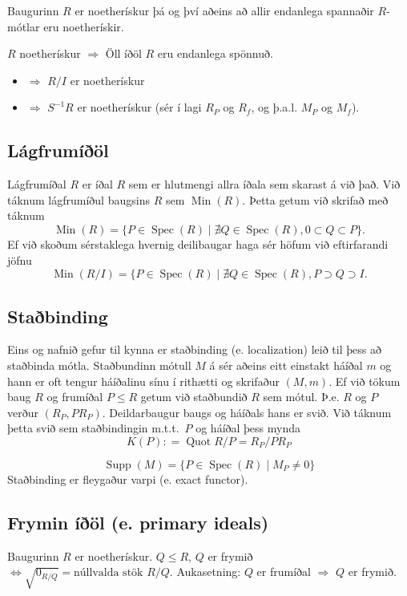 \documentclass[a4paper, 14pt]{article}
\DeclareMathOperator{\Spec}{Spec}
\DeclareMathOperator{\Supp}{Supp}
\DeclareMathOperator{\Min}{Min}
\DeclareMathOperator{\Quot}{Quot}
\newcommand{\then}{\Longrightarrow}
\begin{document}
Baugurinn $R$ er noetherískur þá og því aðeins að allir endanlega spannaðir $R$-mótlar eru noetherískir.

$R$ noetherískur $\then$ Öll íðöl $R$ eru endanlega spönnuð.
\begin{itemize}

    \item $\then$  $R/I$ er noetherískur
    \item $\then$  $S^{-1}R$ er noetherískur (sér í lagi $R_P$ og $R_f$, og þ.a.l. $M_P$ og $M_f$).

\end{itemize}

\subsection{Lágfrumíðöl}
Lágfrumíðal $R$ er íðal $R$ sem er hlutmengi allra íðala sem skarast á við það. Við táknum
lágfrumíðul baugsins $R$ sem $\Min(R)$. Þetta getum við skrifað með táknum
\[
    \Min(R) = \{ P \in \Spec(R) \mid  \nexists Q \in \Spec(R), 0 \subset Q \subset P \}.
\]
Ef við skoðum sérstaklega hvernig deilibaugar haga sér höfum við eftirfarandi jöfnu
\[
    \Min(R/I) = \{ P \in \Spec(R) \mid \nexists Q \in \Spec(R), P \supset Q \supset I.
\]

\subsection{Staðbinding}
Eins og nafnið gefur til kynna er staðbinding (e. localization) leið til þess að staðbinda mótla.
Staðbundinn mótull $M$ á sér aðeins eitt einstakt háíðal $m$ og hann er oft tengur háíðalinu sínu
í rithætti og skrifaður $(M, m)$. Ef við tökum baug $R$ og frumíðal $P \leq R$ getum við staðbundið
$R$ sem mótul. Þ.e. $R$ og $P$ verður $(R_P, PR_P)$.
Deildarbaugur baugs og háíðals hans er svið. Við táknum þetta svið sem staðbindingin m.t.t.\ $P$ og háíðal þess mynda
\[
    K(P) : = \Quot R/P = R_P/PR_P
\]

$$
\Supp(M) = \{ P \in \Spec(R) \mid M_P \neq 0 \} 
$$
Staðbinding er fleygaður varpi (e. exact functor).

\subsection{Frymin íðöl (e. primary ideals)}
Baugurinn $R$ er noetherískur. $Q \leq R$, $Q$ er frymið $\iff \sqrt{0_{R/Q}} = \text{núllvalda stök } R/Q$.
Aukasetning: $Q$ er frumíðal $\then$ $Q$ er frymið.
\end{document}
